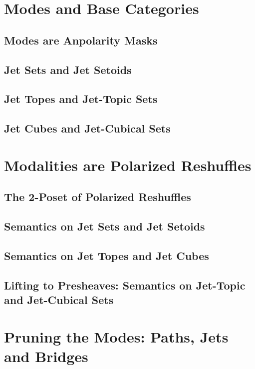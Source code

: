 \documentclass{lmcs} %
\theoremstyle{plain}\newtheorem{satz}[thm]{Satz} %
\theoremstyle{plain}
\theoremstyle{definition}
\begin{document}
\section{Modes and Base Categories}

\subsection{Modes are Anpolarity Masks}

\subsection{Jet Sets and Jet Setoids}

\subsection{Jet Topes and Jet-Topic Sets}

\subsection{Jet Cubes and Jet-Cubical Sets}

\section{Modalities are Polarized Reshuffles}

\subsection{The 2-Poset of Polarized Reshuffles}

\subsection{Semantics on Jet Sets and Jet Setoids}

\subsection{Semantics on Jet Topes and Jet Cubes}

\subsection{Lifting to Presheaves: Semantics on Jet-Topic and Jet-Cubical Sets}

\section{Pruning the Modes: Paths, Jets and Bridges}
\end{document}

